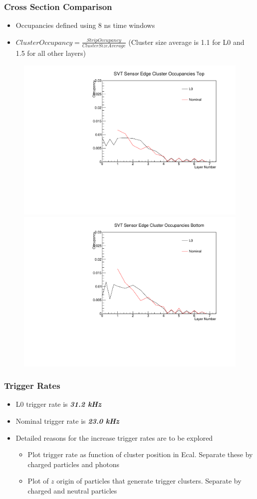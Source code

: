 \documentclass{beamer}
\begin{document}

\begin{frame}
\frametitle{Cross Section Comparison}
\begin{itemize}
\item Occupancies defined using 8 ns time windows
\item $Cluster Occupancy = \frac{Strip Occupancy}{Cluster Size Average}$ (Cluster size average is 1.1 for L0 and 1.5 for all other layers)
\end{itemize}
\begin{figure}
\includegraphics[width=0.55\linewidth]{figs/occupancy_top.pdf}
\includegraphics[width=0.55\linewidth]{figs/occupancy_bot.pdf}
\end{figure}

\end{frame}


\begin{frame}
\frametitle{Trigger Rates}
\begin{itemize}
\item L0 trigger rate is \textbf{\textit{31.2 kHz}}
\item Nominal trigger rate is \textbf{\textit{23.0 kHz}}
\item Detailed reasons for the increase trigger rates are to be explored
\begin{itemize}
\item Plot trigger rate as function of cluster position in Ecal. Separate these by charged particles and photons
\item Plot of $z$ origin of particles that generate trigger clusters. Separate by charged and neutral particles
\end{itemize}
\end{itemize}

\end{frame}
\end{document}
